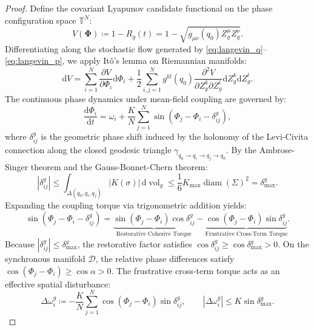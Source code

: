\documentclass[11pt,a4paper,reqno]{article}
\theoremstyle{plain}
\theoremstyle{definition}
\theoremstyle{remark}
\numberwithin{equation}{section}
\begin{document}
\begin{proof}
Define the covariant Lyapunov candidate functional on the phase configuration space $\mathbb{T}^N$:
\begin{equation}
V(\bm{\Phi}) \coloneqq 1 - R_g(t) = 1 - \sqrt{g_{\mu\nu}(q_0) Z_g^\mu Z_g^\nu}.
\end{equation}
Differentiating along the stochastic flow generated by \eqref{eq:langevin_q}--\eqref{eq:langevin_p}, we apply It\^o's lemma on Riemannian manifolds:
\begin{equation}
\mathrm{d}V = \sum_{i=1}^N \frac{\partial V}{\partial \Phi_i} \mathrm{d}\Phi_i + \frac{1}{2} \sum_{i, j=1}^N g^{kl}(q_0) \frac{\partial^2 V}{\partial Z_g^k \partial Z_g^l} \mathrm{d}Z_g^k \mathrm{d}Z_g^l.
\end{equation}
The continuous phase dynamics under mean-field coupling are governed by:
\begin{equation}
\frac{\mathrm{d}\Phi_i}{\mathrm{d}t} = \omega_i + \frac{K}{N} \sum_{j=1}^N \sin\left(\Phi_j - \Phi_i - \delta_{ij}^g\right),
\end{equation}
where $\delta_{ij}^g$ is the geometric phase shift induced by the holonomy of the Levi-Civita connection along the closed geodesic triangle $\gamma_{q_0 \to q_i \to q_j \to q_0}$. By the Ambrose-Singer theorem and the Gauss-Bonnet-Chern theorem:
\begin{equation}
|\delta_{ij}^g| \le \int_{\Delta(q_0, q_i, q_j)} |K(\sigma)| \, \mathrm{d}\operatorname{vol}_g \le \frac{1}{6} K_{\max} \operatorname{diam}(\Sigma)^2 = \delta_{\max}^g.
\end{equation}
Expanding the coupling torque via trigonometric addition yields:
\begin{equation}
\sin(\Phi_j - \Phi_i - \delta_{ij}^g) = \underbrace{\sin(\Phi_j - \Phi_i) \cos \delta_{ij}^g}_{\text{Restorative Cohesive Torque}} - \underbrace{\cos(\Phi_j - \Phi_i) \sin \delta_{ij}^g}_{\text{Frustrative Cross-Term Torque}}.
\label{eq:trig_expansion}
\end{equation}
Because $|\delta_{ij}^g| \le \delta_{\max}^g$, the restorative factor satisfies $\cos \delta_{ij}^g \ge \cos \delta_{\max}^g > 0$. On the synchronous manifold $\mathcal{D}$, the relative phase differences satisfy $\cos(\Phi_j - \Phi_i) \ge \cos \alpha > 0$. The frustrative cross-term torque acts as an effective spatial disturbance:
\begin{equation}
\Delta \omega_i^g \coloneqq -\frac{K}{N} \sum_{j=1}^N \cos(\Phi_j - \Phi_i) \sin \delta_{ij}^g, \qquad |\Delta \omega_i^g| \le K \sin \delta_{\max}^g.

\end{equation}
\end{proof}
\end{document}
